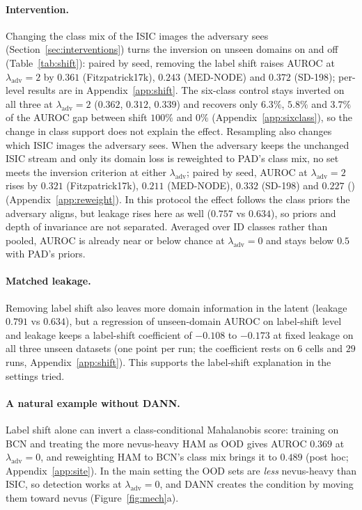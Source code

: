 \documentclass{midl}
\newcommand{\lam}{\lambda_{\mathrm{adv}}}
\begin{document}
\paragraph{Intervention.} Changing the class mix of the ISIC images the adversary sees
(Section~\ref{sec:interventions}) turns the inversion on unseen domains on and off (Table~\ref{tab:shift}): paired by seed,
removing the label shift raises AUROC at $\lam=2$ by $0.361$ (Fitzpatrick17k), $0.243$
(MED-NODE) and $0.372$ (SD-198); per-level results are in Appendix~\ref{app:shift}. The six-class control
stays inverted on all three at $\lam=2$ ($0.362$, $0.312$, $0.339$) and recovers only $6.3\%$, $5.8\%$ and
$3.7\%$ of the AUROC gap between shift $100\%$ and $0\%$ (Appendix~\ref{app:sixclass}), so the change in class
support does not explain the effect. Resampling also changes which ISIC images the adversary sees. When
the adversary keeps the unchanged ISIC stream and only its domain loss is reweighted to PAD's class mix,
no set meets the inversion criterion at either $\lam$; paired by seed, AUROC at $\lam=2$ rises by $0.321$
(Fitzpatrick17k), $0.211$ (MED-NODE), $0.332$ (SD-198) and $0.227$ (\texttt{})
(Appendix~\ref{app:reweight}). In this protocol the effect follows the class priors the adversary aligns,
but leakage rises here as well ($0.757$ vs $0.634$), so priors and depth of invariance are not separated. Averaged over ID classes rather
than pooled, AUROC is already near or below chance at $\lam=0$ and stays below $0.5$ with PAD's priors.

\paragraph{Matched leakage.} Removing label shift also leaves more domain information in the
latent (leakage $0.791$ vs $0.634$), but a regression of unseen-domain AUROC on label-shift
level and leakage keeps a label-shift coefficient of $-0.108$ to $-0.173$ at fixed leakage on
all three unseen datasets (one point per run; the coefficient rests on $6$ cells and $29$ runs,
Appendix~\ref{app:shift}). This supports the label-shift explanation in the settings tried.

\paragraph{A natural example without DANN.} Label shift alone can invert a class-conditional
Mahalanobis score: training on BCN and treating the more nevus-heavy HAM as OOD gives AUROC
$0.369$ at $\lam=0$, and reweighting HAM to BCN's class mix brings it to $0.489$ (post hoc;
Appendix~\ref{app:site}). In the main setting the OOD sets are \emph{less} nevus-heavy than
ISIC, so detection works at $\lam=0$, and DANN creates the condition by moving them toward
nevus (Figure~\ref{fig:mech}a).
\end{document}
